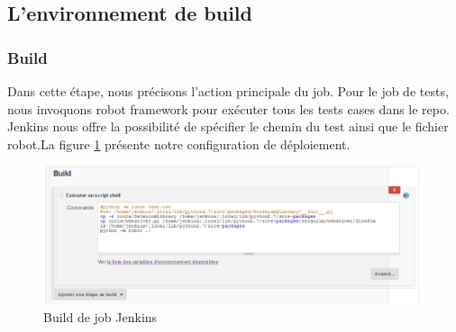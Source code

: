 \subsection{L’environnement de build}
\subsubsection{Build}
Dans cette étape, nous précisons l’action principale du job. Pour le job de tests, nous invoquons robot framework pour exécuter tous les tests cases dans le repo. Jenkins nous offre la possibilité de spécifier le chemin du test ainsi que le fichier robot.\newpage La figure \ref{fig:build} présente notre configuration de déploiement.
\begin{figure}[H]
	\centering
	\includegraphics[width=01\linewidth]{img/jenkins/build}
	\caption[Build de job Jenkins]{Build de job Jenkins}
	\label{fig:build}
\end{figure}

